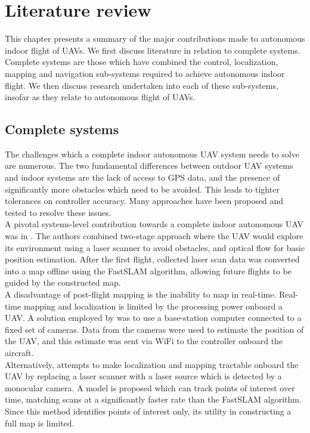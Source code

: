 \documentclass[capstone_report.tex]{subfiles}
\begin{document}
\chapter{Literature review}
This chapter presents a summary of the major contributions made to autonomous indoor flight of UAVs. We first discuss literature in relation to complete systems. Complete systems are those which have combined the control, localization, mapping and navigation sub-systems required to achieve autonomous indoor flight. We then discuss research undertaken into each of these sub-systems, insofar as they relate to autonomous flight of UAVs.


\section{Complete systems}
The challenges which a complete indoor autonomous UAV system needs to solve are numerous. The two fundamental differences between outdoor UAV systems and indoor systems are the lack of access to GPS data, and the presence of significantly more obstacles which need to be avoided. This leads to tighter tolerances on controller accuracy. Many approaches have been proposed and tested to resolve these issues.\\

A pivotal systems-level contribution towards a complete indoor autonomous UAV was in \cite{feicui}. The authors combined two-stage approach where the UAV would explore its environment using a laser scanner to avoid obstacles, and optical flow for basic position estimation. After the first flight, collected laser scan data was converted into a map offline using the FastSLAM algorithm, allowing future flights to be guided by the constructed map. \\

A disadvantage of post-flight mapping is the inability to map in real-time. Real-time mapping and localization is limited by the processing power onboard a UAV. A solution employed by \cite{yu:ccdc:2017} was to use a base-station computer connected to a fixed set of cameras. Data from the cameras were used to estimate the position of the UAV, and this estimate was sent via WiFi to the controller onboard the aircraft. \\

Alternatively, \cite{qzeng} attempts to make localization and mapping tractable onboard the UAV by replacing a laser scanner with a laser source which is detected by a monocular camera. A model is proposed which can track points of interest over time, matching scans at a significantly faster rate than the FastSLAM algorithm. Since this method identifies points of interest only, its utility in constructing a full map is limited.\\
\end{document}
